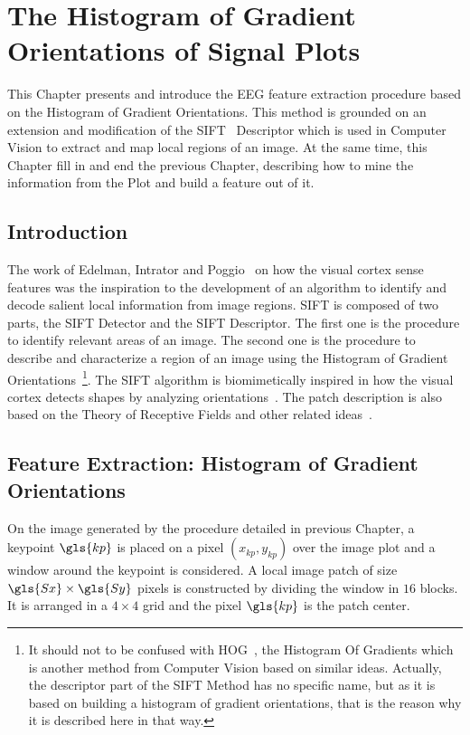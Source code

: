 \chapter{The Histogram of Gradient Orientations of Signal Plots}
\label{chapter:three}

This Chapter presents and introduce the EEG feature extraction procedure based on the Histogram of Gradient Orientations.  This method is grounded on an extension and modification of the SIFT~\cite{Lowe2004} Descriptor which is used in Computer Vision to extract and map local regions of an image.  At the same time, this Chapter fill in and end the previous Chapter, describing how to mine the information from the Plot and build a feature out of it.

\section{Introduction}


The work of Edelman, Intrator and Poggio~\cite{cogprints561} on how the visual cortex sense features was the inspiration to the development of an algorithm to identify and decode salient local information from image regions.  SIFT is composed of two parts, the SIFT Detector and the SIFT Descriptor.  The first one is the procedure to identify relevant areas of an image.  The second one is the procedure to describe and characterize a region of an image using the Histogram of Gradient Orientations~\footnote{It should not to be confused with HOG~\cite{Dalal2005}, the Histogram Of Gradients which is another method from Computer Vision based on similar ideas.  Actually, the descriptor part of the SIFT Method has no specific name, but as it is based on building a histogram of gradient orientations, that is the reason why it is described here in that way. }.  The SIFT algorithm is biomimetically inspired in how the visual cortex detects shapes by analyzing orientations~\cite{cogprints561}.  The patch description is also based on the Theory of Receptive Fields and other related ideas~\cite{Lindeberg2013}.

\section{Feature Extraction: Histogram of Gradient Orientations}
\label{SIFT}

On the image generated by the procedure detailed in previous Chapter, a keypoint $\gls{kp}$ is placed on a pixel $(x_{kp}, y_{kp})$ over the image plot and a window around the keypoint is considered. A local image patch of size $\gls{Sx} \times \gls{Sy}$ pixels is constructed by dividing the window in $16$ blocks. It is arranged in a $4 \times 4$ grid and the pixel $\gls{kp}$ is the patch center. 

